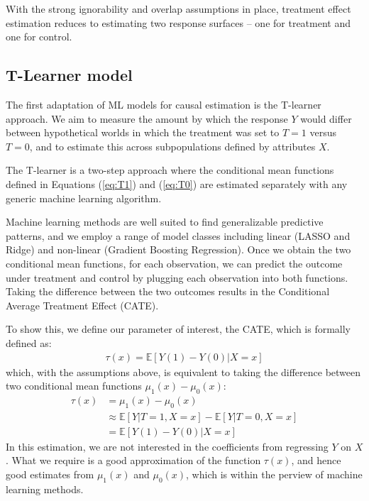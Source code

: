 \documentclass[12pt, a4paper]{article}
\begin{document}
With the strong ignorability and overlap assumptions in place, treatment effect estimation reduces to estimating two response surfaces – one for treatment and one for control.

\subsection{T-Learner model}

The first adaptation of ML models for causal estimation is the T-learner approach. We aim to measure the amount by which the
response $Y$ would differ between hypothetical worlds in which the treatment
was set to $T=1$ versus $T=0$, and to estimate this across subpopulations
defined by attributes $X$. 

The T-learner is a two-step approach where the conditional mean functions defined in Equations (\ref{eq:T1}) and (\ref{eq:T0}) are estimated separately with any generic machine learning algorithm.

Machine learning methods are well suited to find generalizable predictive patterns, and we employ a range of model classes including linear (LASSO and Ridge) and non-linear (Gradient Boosting Regression). Once we obtain the two conditional mean functions, for each observation, we can predict the outcome under treatment and control by plugging each observation into both functions. Taking the difference between the two outcomes results in the Conditional Average Treatment Effect (CATE).

To show this, we define our parameter of interest, the CATE, which is formally defined as:
\begin{align}
\tau (x) = \mathbb{E}[Y(1) - Y(0) | X{=}x]
\end{align}
which, with the assumptions above, is equivalent to taking the difference between two conditional mean functions $\mu _1(x) - \mu _0(x)$:
\begin{align}
\tau (x) & = \mu _1(x) - \mu _0(x) \nonumber \\
  & \approx \mathbb{E}[Y | T {=} 1, X {=} x] - \mathbb{E}[Y | T {=} 0, X {=} x] \nonumber \\
& = \mathbb{E}[Y(1) - Y(0) | X {=} x] \label{eq:indTE}
\end{align}
In this estimation, we are not interested in the coefficients from regressing
$Y$ on $X$. What we require is a good approximation of the function $\tau(x)$,
and hence good estimates from $\mu_1(x)$ and $\mu_0(x)$, which is within the
perview of machine learning methods.
\end{document}
